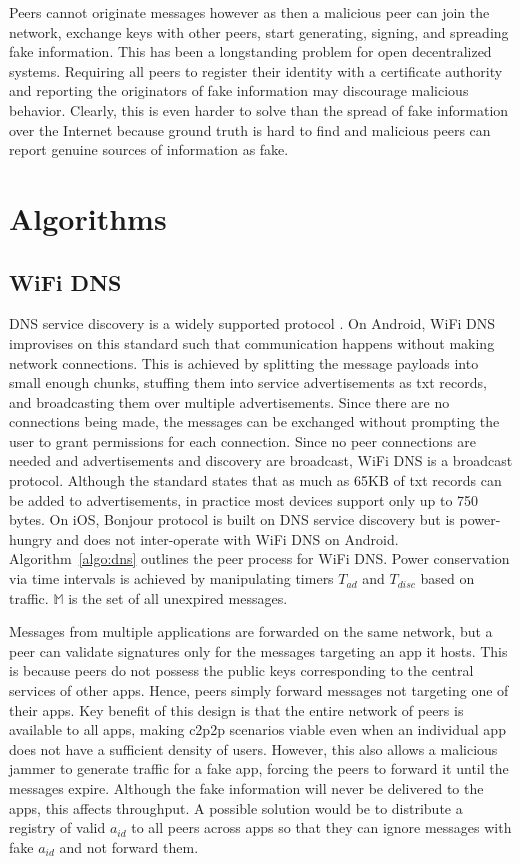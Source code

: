 \documentclass[conference]{IEEEtran}
\begin{document}
Peers cannot originate messages however as then a malicious peer can
join the network, exchange keys with other peers, start generating,
signing, and spreading fake information. This has been a longstanding
problem for open decentralized systems. Requiring all peers to
register their identity with a certificate authority and reporting the
originators of fake information may discourage malicious behavior.
Clearly, this is even harder to solve than the spread of fake
information over the Internet because ground truth is hard to find and
malicious peers can report genuine sources of information as fake.
%
\section{Algorithms}
\label{sec:algo}
%
\subsection{WiFi DNS}
\label{sec:wifi}
%
DNS service discovery is a widely supported protocol
\cite{cheshire-dns-sd-2013}. On Android, WiFi DNS improvises on this
standard such that communication happens without making network
connections. This is achieved by splitting the message payloads into
small enough chunks, stuffing them into service advertisements as txt
records, and broadcasting them over multiple advertisements. Since
there are no connections being made, the messages can be exchanged
without prompting the user to grant permissions for each
connection. Since no peer connections are needed and advertisements
and discovery are broadcast, WiFi DNS is a broadcast
protocol. Although the standard states that as much as 65KB of txt
records can be added to advertisements, in practice most devices
support only up to 750 bytes. On iOS, Bonjour protocol is built on DNS
service discovery but is power-hungry and does not inter-operate with
WiFi DNS on Android. Algorithm~\ref{algo:dns} outlines the peer
process for WiFi DNS. Power conservation via time intervals is
achieved by manipulating timers $T_{ad}$ and $T_{disc}$ based on
traffic. $\mathbb{M}$ is the set of all unexpired messages.

Messages from multiple applications are forwarded on the same network,
but a peer can validate signatures only for the messages targeting an
app it hosts. This is because peers do not possess the public keys
corresponding to the central services of other apps. Hence, peers
simply forward messages not targeting one of their apps. Key benefit
of this design is that the entire network of peers is available to all
apps, making c2p2p scenarios viable even when an individual app does
not have a sufficient density of users.  However, this also allows a
malicious jammer to generate traffic for a fake app, forcing the peers
to forward it until the messages expire.  Although the fake
information will never be delivered to the apps, this affects
throughput. A possible solution would be to distribute a registry of
valid $a_{id}$ to all peers across apps so that they can ignore
messages with fake $a_{id}$ and not forward them.
\end{document}
